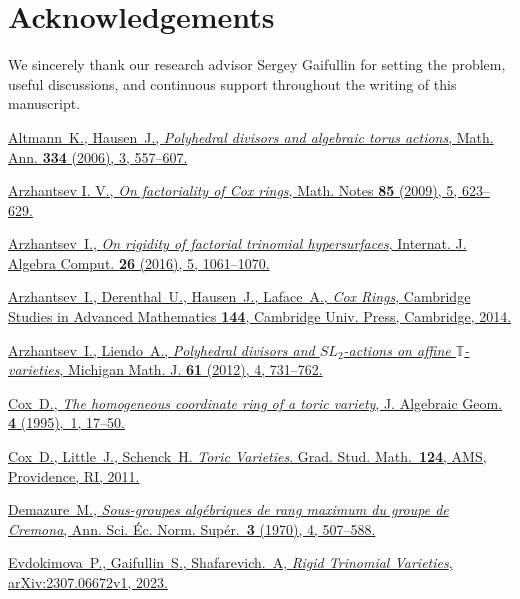 \documentclass[a4paper,reqno,12pt]{amsart}
\theoremstyle{plain}
\theoremstyle{definition}
\theoremstyle{plain}
\theoremstyle{remark}
\newcommand{\TT}{\mathbb{T}}
\begin{document}
\section*{Acknowledgements} We sincerely thank our research advisor Sergey Gaifullin for setting the problem, useful discussions, and continuous support throughout the writing of this manuscript.

\begin{thebibliography}{}

\href{https://doi.org/10.1007/s00208-005-0705-8}{Altmann~K., Hausen~J.,
\emph{Polyhedral divisors and algebraic torus actions},
Math. Ann. {\bf 334} (2006), 3, 557--607.}

\href{https://doi.org/10.1134/S0001434609050022}{Arzhantsev I. V., \emph{On factoriality of Cox rings},
Math. Notes {\bf 85} (2009), 5, 623--629.}

\href{https://publications.hse.ru/pubs/share/folder/55oftwk83x/187956490.pdf}{Arzhantsev~I.,
\emph{On rigidity of factorial trinomial hypersurfaces},
Internat. J. Algebra Comput. {\bf 26} (2016), 5, 1061--1070.}

\href{https://doi.org/10.1017/CBO9781139175852}{Arzhantsev~I., Derenthal~U., Hausen~J., Laface~A., \textit{Cox Rings}, Cambridge Studies in Advanced Mathematics {\bf 144}, Cambridge Univ. Press, Cambridge, 2014.}

\href{https://doi.org/10.1307/mmj/1353098511}{Arzhantsev~I., Liendo~A.,
\emph{Polyhedral divisors and $SL_2$-actions on affine ${\TT}$-varieties},
Michigan Math. J. {\bf 61} (2012), 4, 731--762.}

\href{https://arxiv.org/pdf/alg-geom/9210008}{Cox~D.,
\emph{The homogeneous coordinate ring of a toric variety},
J. Algebraic Geom. {\bf 4} (1995),~1, 17--50.}

\href{https://pi.math.cornell.edu/~tsh/cornell-only/cox-little-schenck-toric.pdf}{Cox~D., Little~J., Schenck~H. \emph{Toric Varieties}. Grad. Stud. Math.~{\bf 124}, AMS, Providence, RI, 2011.}

\href{https://www.numdam.org/item/ASENS_1970_4_3_4_507_0/}{Demazure~M., \emph{Sous-groupes alg\'ebriques de rang maximum du groupe de Cremona}, Ann. Sci. \'Ec. Norm. Sup\'er.~{\bf 3} (1970), 4, 507--588.}

\href{https://arxiv.org/abs/2307.06672}{Evdokimova~P., Gaifullin~S., Shafarevich.~A,
\emph{Rigid Trinomial Varieties}, arXiv:2307.06672v1, 2023.}


\end{thebibliography}
\end{document}
